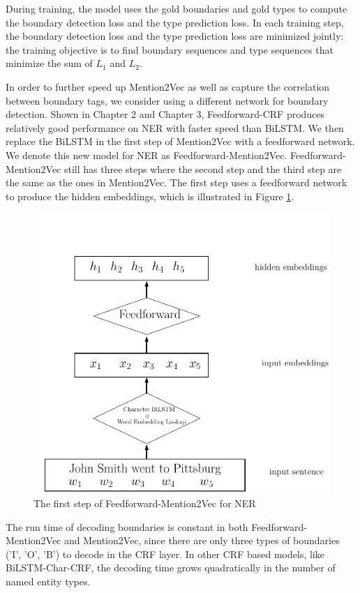 During training, the model uses the gold boundaries and gold types to compute the boundary detection loss and the type prediction loss. In each training step, the boundary detection loss and the type prediction loss are minimized jointly: the training objective is to find boundary sequences and type sequences that minimize the sum of $L_{1}$ and $L_{2}$.


In order to further speed up Mention2Vec as well as capture the correlation between boundary tags, we consider using a different network for boundary detection. Shown in Chapter 2 and Chapter 3, Feedforward-CRF produces relatively good performance on NER with faster speed than BiLSTM. We then replace the BiLSTM in the first step of Mention2Vec with a feedforward network. We denote this new model for NER as Feedforward-Mention2Vec. Feedforward-Mention2Vec still has three steps where the second step and the third step are the same as the ones in Mention2Vec. The first step uses a feedforward network to produce the hidden embeddings, which is illustrated in Figure \ref{fig:mention2vec4}.

\begin{figure}
  \centering
  \includegraphics[scale=0.6]{mention2vec4.pdf}
 \caption{The first step of Feedforward-Mention2Vec for NER}
  \label{fig:mention2vec4}
\end{figure}

The run time of decoding boundaries is constant in both Feedforward-Mention2Vec and Mention2Vec, since there are only three types of boundaries ('I', 'O', 'B') to decode in the CRF layer. In other CRF based models, like BiLSTM-Char-CRF, the decoding time grows quadratically in the number of named entity types. 

